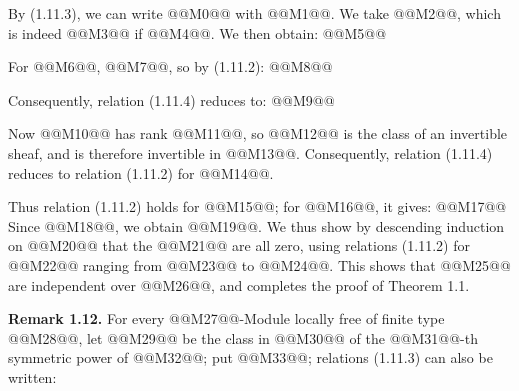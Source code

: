 By (1.11.3), we can write
@@M0@@
with @@M1@@. We take @@M2@@, which is indeed @@M3@@ if @@M4@@. We then obtain:
@@M5@@

For @@M6@@, @@M7@@, so by (1.11.2):
@@M8@@

Consequently, relation (1.11.4) reduces to:
@@M9@@

Now @@M10@@ has rank @@M11@@, so @@M12@@ is the class of an invertible sheaf, and is therefore invertible in @@M13@@. Consequently, relation (1.11.4) reduces to relation (1.11.2) for @@M14@@.

Thus relation (1.11.2) holds for @@M15@@; for @@M16@@, it gives:
@@M17@@
Since @@M18@@, we obtain @@M19@@. We thus show by descending induction on @@M20@@ that the @@M21@@ are all zero, using relations (1.11.2) for @@M22@@ ranging from @@M23@@ to @@M24@@. This shows that @@M25@@ are independent over @@M26@@, and completes the proof of Theorem 1.1.

\textbf{Remark 1.12.} For every @@M27@@-Module locally free of finite type @@M28@@, let @@M29@@ be the class in @@M30@@ of the @@M31@@-th symmetric power of @@M32@@; put @@M33@@; relations (1.11.3) can also be written:
